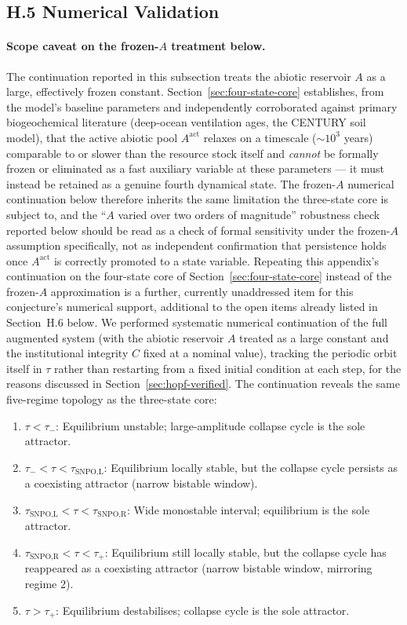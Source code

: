 \documentclass[twocolumn,10pt]{article}
\begin{document}
\subsection{H.5 Numerical Validation}
\paragraph{Scope caveat on the frozen-$A$ treatment below.} The continuation reported in this subsection treats the abiotic reservoir $A$ as a large, effectively frozen constant. Section~\ref{sec:four-state-core} establishes, from the model's baseline parameters and independently corroborated against primary biogeochemical literature (deep-ocean ventilation ages, the CENTURY soil model), that the active abiotic pool $A^{\text{act}}$ relaxes on a timescale (${\sim}10^3$ years) comparable to or slower than the resource stock itself and \emph{cannot} be formally frozen or eliminated as a fast auxiliary variable at these parameters --- it must instead be retained as a genuine fourth dynamical state. The frozen-$A$ numerical continuation below therefore inherits the same limitation the three-state core is subject to, and the ``$A$ varied over two orders of magnitude'' robustness check reported below should be read as a check of formal sensitivity under the frozen-$A$ assumption specifically, not as independent confirmation that persistence holds once $A^{\text{act}}$ is correctly promoted to a state variable. Repeating this appendix's continuation on the four-state core of Section~\ref{sec:four-state-core} instead of the frozen-$A$ approximation is a further, currently unaddressed item for this conjecture's numerical support, additional to the open items already listed in Section~H.6 below. We performed systematic numerical continuation of the full augmented system (with the abiotic reservoir $A$ treated as a large constant and the institutional integrity $C$ fixed at a nominal value), tracking the periodic orbit itself in $\tau$ rather than restarting from a fixed initial condition at each step, for the reasons discussed in Section~\ref{sec:hopf-verified}. The continuation reveals the same five-regime topology as the three-state core:
\begin{enumerate}
    \item $\tau < \tau_-$: Equilibrium unstable; large-amplitude collapse cycle is the sole attractor.
    \item $\tau_- < \tau < \tau_{\text{SNPO,L}}$: Equilibrium locally stable, but the collapse cycle persists as a coexisting attractor (narrow bistable window).
    \item $\tau_{\text{SNPO,L}} < \tau < \tau_{\text{SNPO,R}}$: Wide monostable interval; equilibrium is the sole attractor.
    \item $\tau_{\text{SNPO,R}} < \tau < \tau_+$: Equilibrium still locally stable, but the collapse cycle has reappeared as a coexisting attractor (narrow bistable window, mirroring regime 2).
    \item $\tau > \tau_+$: Equilibrium destabilises; collapse cycle is the sole attractor.
\end{enumerate}
\end{document}
